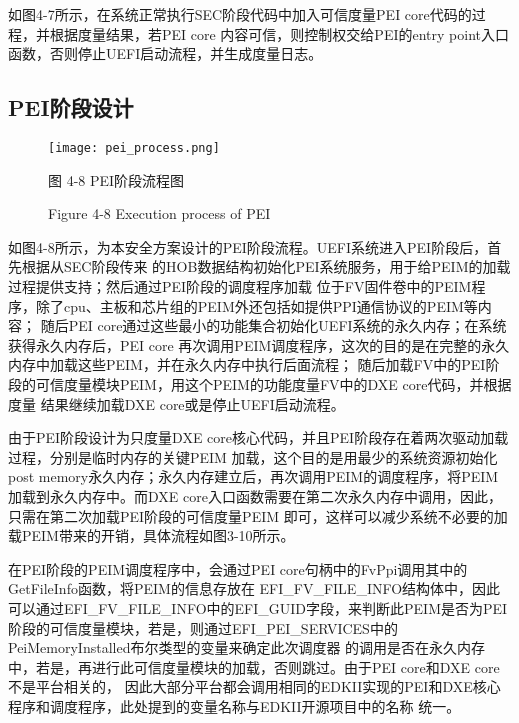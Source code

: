 如图4-7所示，在系统正常执行SEC阶段代码中加入可信度量PEI core代码的过程，并根据度量结果，若PEI core
内容可信，则控制权交给PEI的entry point入口函数，否则停止UEFI启动流程，并生成度量日志。

\subsection{PEI阶段设计}

\begin{figure}[htb]
    \vspace{0cm}   
    \setlength{\abovecaptionskip}{0.3cm}
	\centering
    \texttt{[image: pei\_process.png]}
    \caption*{图 4-8 PEI阶段流程图}
    \setlength{\belowcaptionskip}{-0.7cm}
    \caption*{Figure 4-8 Execution process of PEI}
\end{figure}

如图4-8所示，为本安全方案设计的PEI阶段流程。UEFI系统进入PEI阶段后，首先根据从SEC阶段传来
的HOB数据结构初始化PEI系统服务，用于给PEIM的加载过程提供支持；然后通过PEI阶段的调度程序加载
位于FV固件卷中的PEIM程序，除了cpu、主板和芯片组的PEIM外还包括如提供PPI通信协议的PEIM等内容；
随后PEI core通过这些最小的功能集合初始化UEFI系统的永久内存；在系统获得永久内存后，PEI core
再次调用PEIM调度程序，这次的目的是在完整的永久内存中加载这些PEIM，并在永久内存中执行后面流程；
随后加载FV中的PEI阶段的可信度量模块PEIM，用这个PEIM的功能度量FV中的DXE core代码，并根据度量
结果继续加载DXE core或是停止UEFI启动流程。

\par 由于PEI阶段设计为只度量DXE core核心代码，并且PEI阶段存在着两次驱动加载过程，分别是临时内存的关键PEIM
加载，这个目的是用最少的系统资源初始化post memory永久内存；永久内存建立后，再次调用PEIM的调度程序，将PEIM
加载到永久内存中。而DXE core入口函数需要在第二次永久内存中调用，因此，只需在第二次加载PEI阶段的可信度量PEIM
即可，这样可以减少系统不必要的加载PEIM带来的开销，具体流程如图3-10所示。
\par 在PEI阶段的PEIM调度程序中，会通过PEI core句柄中的FvPpi调用其中的GetFileInfo函数，将PEIM的信息存放在
EFI\_FV\_FILE\_INFO结构体中，因此可以通过EFI\_FV\_FILE\_INFO中的EFI\_GUID字段，来判断此PEIM是否为PEI
阶段的可信度量模块，若是，则通过EFI\_PEI\_SERVICES中的PeiMemoryInstalled布尔类型的变量来确定此次调度器
的调用是否在永久内存中，若是，再进行此可信度量模块的加载，否则跳过。由于PEI core和DXE core不是平台相关的，
因此大部分平台都会调用相同的EDKII\cite{extra4}实现的PEI和DXE核心程序和调度程序，此处提到的变量名称与EDKII开源项目中的名称
统一。

